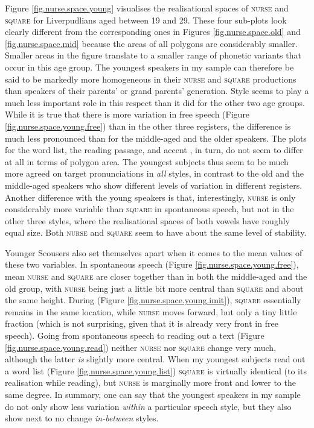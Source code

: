 Figure \ref{fig.nurse.space.young} visualises the realisational spaces of \textsc{nurse} and \textsc{square} for Liverpudlians aged between 19 and 29.
These four sub-plots look clearly different from the corresponding ones in Figures \ref{fig.nurse.space.old} and \ref{fig.nurse.space.mid} because the areas of all polygons are considerably smaller.
Smaller areas in the figure translate to a smaller range of phonetic variants that occur in this age group.
The youngest speakers in my sample can therefore be said to be markedly more homogeneous in their \textsc{nurse} and \textsc{square} productions than speakers of their parents' or grand parents' generation.
Style seems to play a much less important role in this respect than it did for the other two age groups.
While it is true that there is more variation in free speech (Figure \ref{fig.nurse.space.young.free}) than in the other three registers, the difference is much less pronounced than for the middle-aged and the older speakers.
The plots for the word list, the reading passage, and accent , in turn, do not seem to differ at all in terms of polygon area.
The youngest subjects thus seem to be much more agreed on target pronunciations in \emph{all} styles, in contrast to the old and the middle-aged speakers who show different levels of variation in different registers.
Another difference with the young speakers is that, interestingly, \textsc{nurse} is only considerably more variable than \textsc{square} in spontaneous speech, but not in the other three styles, where the realisational spaces of both vowels have roughly equal size.
Both \textsc{nurse} and \textsc{square} seem to have about the same level of stability.

Younger Scousers also set themselves apart when it comes to the mean values of these two variables.
In spontaneous speech (Figure \ref{fig.nurse.space.young.free}), mean \textsc{nurse} and \textsc{square} are closer together than in both the middle-aged and the old group, with \textsc{nurse} being just a little bit more central than \textsc{square} and about the same height.
During  (Figure \ref{fig.nurse.space.young.imit}), \textsc{square} essentially remains in the same location, while \textsc{nurse} moves forward, but only a tiny little fraction (which is not surprising, given that it is already very front in free speech).
Going from spontaneous speech to reading out a text (Figure \ref{fig.nurse.space.young.read}) neither \textsc{nurse} nor \textsc{square} change very much, although the latter \emph{is} slightly more central.
When my youngest subjects read out a word list (Figure \ref{fig.nurse.space.young.list}) \textsc{square} is virtually identical (to its realisation while reading), but \textsc{nurse} is marginally more front and lower to the same degree.
In summary, one can say that the youngest speakers in my sample do not only show less variation \emph{within} a particular speech style, but they also show next to no change \emph{in-between} styles.

